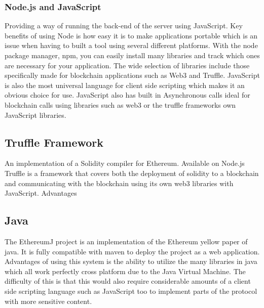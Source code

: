 \documentclass{entcs}
\begin{document}
\subsubsection{Node.js and JavaScript}
Providing a way of running the back-end of the server using JavaScript. Key benefits of using Node is how easy it is to make applications portable which is an issue when having to built a tool using several different platforms. With the node package manager, npm, you can easily install many libraries and track which ones are necessary for your application. The wide selection of libraries include those specifically made for blockchain applications such as Web3 and Truffle.
JavaScript is also the most universal language for client side scripting which makes it an obvious choice for use. JavaScript also has built in Asynchronous calls ideal for blockchain calls using libraries such as web3 or the truffle frameworks own JavaScript libraries. 

\subsection{Truffle Framework}
An implementation of a Solidity compiler for Ethereum. Available on Node.js Truffle \cite{truffle} is a framework that covers both the deployment of solidity to a blockchain and communicating with the blockchain using its own web3 libraries with JavaScript. Advantages

\subsection{Java}
The EthereumJ project is an implementation of the Ethereum yellow paper of java. It is fully compatible with maven to deploy the project as a web application. Advantages of using this system is the ability to utilize the many libraries in java which all work perfectly cross platform due to the Java Virtual Machine. The difficulty of this is that this would also require considerable amounts of a client side scripting language such as JavaScript too to implement parts of the protocol with more sensitive content. 
\end{document}
